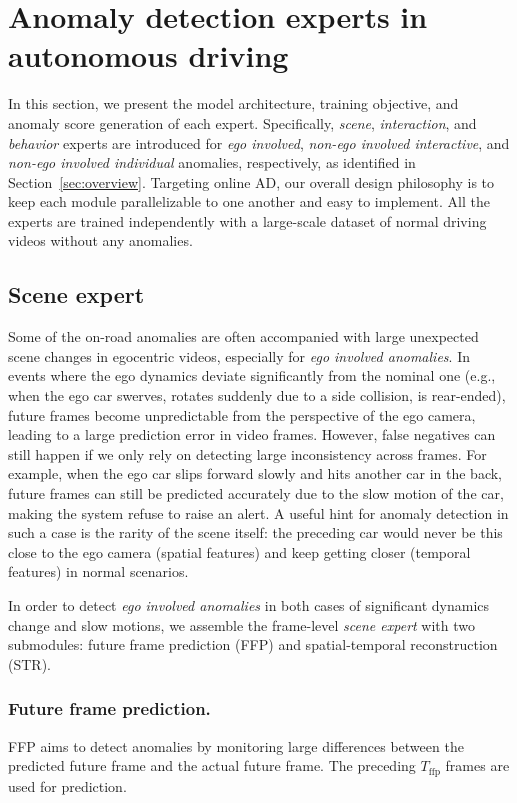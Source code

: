 \section{Anomaly detection experts in autonomous driving}

In this section, we present the model architecture, training objective, and anomaly score generation of each expert. Specifically, \textit{scene}, \textit{interaction}, and \textit{behavior} experts are introduced for \textit{ego involved}, \textit{non-ego involved interactive}, and \textit{non-ego involved individual} anomalies, respectively, as identified in Section~\ref{sec:overview}. Targeting online AD, our overall design philosophy is to keep each module parallelizable to one another and easy to implement. All the experts are trained independently with a large-scale dataset of normal driving videos without any anomalies.

\subsection{Scene expert}

Some of the on-road anomalies are often accompanied with large unexpected scene changes in egocentric videos, especially for \textit{ego involved anomalies}. In events where the ego dynamics deviate significantly from the nominal one (e.g., when the ego car swerves, rotates suddenly due to a side collision, is rear-ended), future frames become unpredictable from the perspective of the ego camera, leading to a large prediction error in video frames. However, false negatives can still happen if we only rely on detecting large inconsistency across frames. For example, when the ego car slips forward slowly and hits another car in the back, future frames can still be predicted accurately due to the slow motion of the car, making the system refuse to raise an alert. A useful hint for anomaly detection in such a case is the rarity of the scene itself: the preceding car would never be this close to the ego camera (spatial features) and keep getting closer (temporal features) in normal scenarios.

In order to detect \textit{ego involved anomalies} in both cases of significant dynamics change and slow motions, we assemble the frame-level \textit{scene expert} with two submodules: future frame prediction (FFP) and spatial-temporal reconstruction (STR).

\subsubsection{Future frame prediction.}
FFP aims to detect anomalies by monitoring large differences between the predicted future frame and the actual future frame. The preceding $T_\text{ffp}$ frames are used for prediction.

